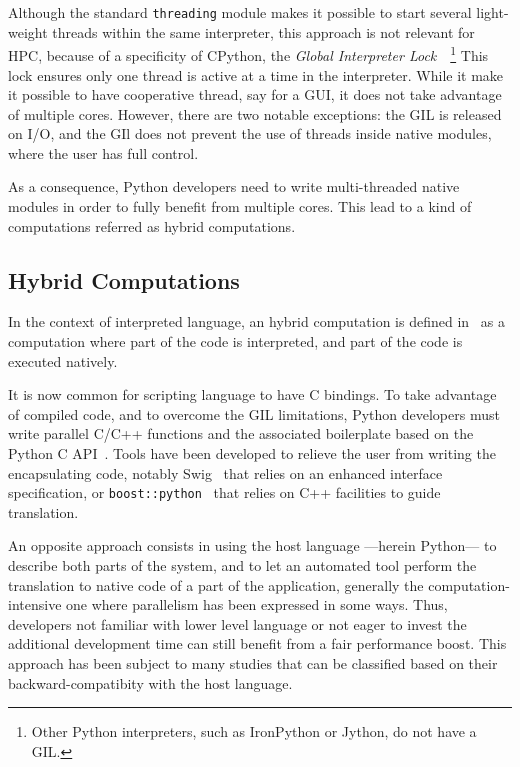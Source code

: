 \documentclass{llncs}
\begin{document}
Although the standard \texttt{threading} module makes it possible to start
several light-weight threads within the same interpreter, this approach is not
relevant for HPC, because of a specificity of CPython, the \emph{Global
Interpreter Lock}~\cite{gil2012}~\footnote{Other Python interpreters, such as
IronPython or Jython, do not have a GIL.} This lock ensures only one thread is
active at a time in the interpreter. While it make it possible to have
cooperative thread, say for a GUI, it does not take advantage of multiple cores.
However, there are two notable exceptions: the GIL is released on I/O, and the
GIl does not prevent the use of threads inside native modules, where the user
has full control.

As a consequence, Python developers need to write multi-threaded native
modules in order to fully benefit from multiple cores. This lead to a kind of
computations referred as hybrid computations.



\subsection{Hybrid Computations}

In the context of interpreted language, an hybrid computation is defined
in~\cite{dongara2007} as a computation where part of the code is interpreted,
and part of the code is executed natively.

It is now common for scripting language to have C bindings. To take advantage of
compiled code, and to overcome the GIL limitations, Python developers must write
parallel C/C++ functions and the associated boilerplate based on the Python C
API~\cite{pythoncapi}. Tools have been developed to relieve the user from
writing the encapsulating code, notably Swig~\cite{swig2003} that relies on an
enhanced interface specification, or
\texttt{boost::python}~\cite{boostpython2007} that relies on C++ facilities to
guide translation.

An opposite approach consists in using the host language ---herein Python---
to describe both parts of the system, and to let an automated tool perform the
translation to native code of a part of the application, generally the
computation-intensive one where parallelism has been expressed in some ways.
Thus, developers not familiar with lower level language or not eager to invest
the additional development time can still benefit from a fair performance boost.
This approach has been subject to many studies that can be classified based on
their backward-compatibity with the host language.
\end{document}
